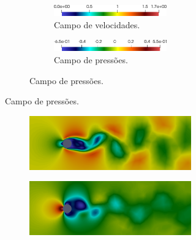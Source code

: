 \begin{figure}[h!]
    \centering
    \caption{Resultados no instante $t=60$.}
    \begin{subfigure}{\textwidth}
        \begin{subfigure}{\textwidth}\centering
            \begin{subfigure}{.42\textwidth}
                \caption*{Campo de velocidades.}
                \includegraphics[width=\linewidth]{Figuras/cylinder/Legenda-vel.png}
            \end{subfigure}
            \begin{subfigure}{.42\textwidth}
                \caption*{Campo de pressões.}
                \includegraphics[width=\linewidth]{Figuras/cylinder/Legenda-pre.png}
            \end{subfigure}
        \end{subfigure}
    \end{subfigure}
    \begin{subfigure}{\textwidth}\centering
        \begin{subfigure}{.42\textwidth}
            \includegraphics[width=\linewidth]{Figuras/cylinder/VMS-Lin-vel.png}
        \end{subfigure}
        \begin{subfigure}{.42\textwidth}
            \includegraphics[width=\linewidth]{Figuras/cylinder/VMS-Lin-pre.png}

\end{subfigure}
\end{subfigure}
\end{figure}
